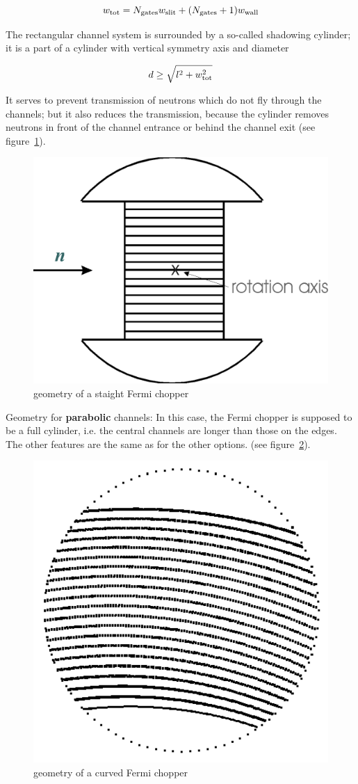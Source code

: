 \begin{equation}
w_{\rm tot} = N_{\rm gates} w_{\rm slit} + (N_{\rm gates}+1) w_{\rm wall}
\end{equation}

The rectangular channel system is surrounded by a so-called shadowing cylinder; it is a
part of a cylinder with vertical symmetry axis and diameter

\begin{equation}
d \geq \sqrt{l^2 + w_{\rm tot}^2}
\end{equation}

It serves to prevent transmission of neutrons which do not fly through the channels;
but it also reduces the transmission, because the cylinder removes neutrons
in front of the channel entrance or behind the channel exit (see figure~\ref{f:vit_fc1}).

\begin{figure}[ht]
\begin{center}
\includegraphics[width=0.45\linewidth]{figures/vitess_fc_str}
\caption{geometry of a staight Fermi chopper\label{f:vit_fc1}}
\end{center}
\end{figure}

Geometry for {\bf parabolic} channels:
In this case, the Fermi chopper is supposed to be a full cylinder, i.e. the central
channels are longer than those on the edges. The other features are the same as for
the other options. (see figure~\ref{f:vit_fc2}).

\begin{figure}[ht]
\begin{center}
\includegraphics[width=0.4\linewidth]{figures/vitess_fc_parab}
\caption{geometry of a curved Fermi chopper\label{f:vit_fc2}}
\end{center}
\end{figure}

